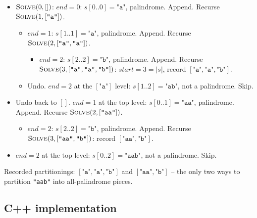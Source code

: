 \begin{itemize}
  \item $\textsc{Solve}(0,[])$: $\textit{end}=0$:
        $s[0..0]=\texttt{"a"}$, palindrome. Append. Recurse
        $\textsc{Solve}(1,[\texttt{"a"}])$.
  \begin{itemize}
    \item $\textit{end}=1$: $s[1..1]=\texttt{"a"}$, palindrome.
          Append. Recurse $\textsc{Solve}(2,[\texttt{"a"},\texttt{"a"}])$.
    \begin{itemize}
      \item $\textit{end}=2$: $s[2..2]=\texttt{"b"}$, palindrome.
            Append. Recurse $\textsc{Solve}(3,[\texttt{"a"},\texttt{"a"},\texttt{"b"}])$:
            $\textit{start}=3=|s|$, record
            $[\texttt{"a"},\texttt{"a"},\texttt{"b"}]$.
    \end{itemize}
    \item Undo. $\textit{end}=2$ at the $[\texttt{"a"}]$ level:
          $s[1..2]=\texttt{"ab"}$, not a palindrome. Skip.
  \end{itemize}
  \item Undo back to $[]$. $\textit{end}=1$ at the top level:
        $s[0..1]=\texttt{"aa"}$, palindrome. Append. Recurse
        $\textsc{Solve}(2,[\texttt{"aa"}])$.
  \begin{itemize}
    \item $\textit{end}=2$: $s[2..2]=\texttt{"b"}$, palindrome.
          Append. Recurse $\textsc{Solve}(3,[\texttt{"aa"},\texttt{"b"}])$:
          record $[\texttt{"aa"},\texttt{"b"}]$.
  \end{itemize}
  \item $\textit{end}=2$ at the top level: $s[0..2]=\texttt{"aab"}$,
        not a palindrome. Skip.
\end{itemize}

Recorded partitionings: $[\texttt{"a"},\texttt{"a"},\texttt{"b"}]$ and
$[\texttt{"aa"},\texttt{"b"}]$ -- the only two ways to partition
\texttt{"aab"} into all-palindrome pieces.

\subsection*{C++ implementation}

